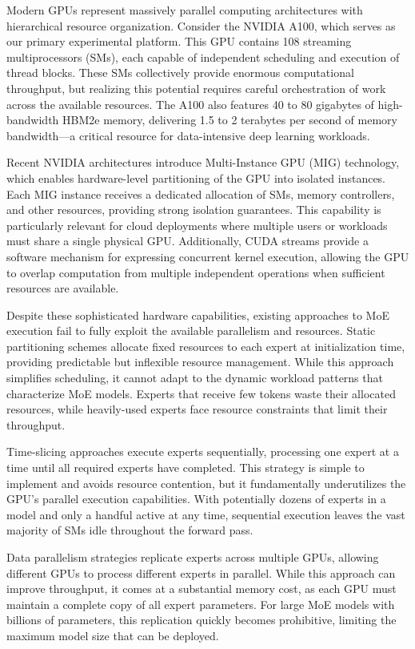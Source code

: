 \documentclass{article}
\begin{document}
Modern GPUs represent massively parallel computing architectures with hierarchical resource organization. Consider the NVIDIA A100, which serves as our primary experimental platform. This GPU contains 108 streaming multiprocessors (SMs), each capable of independent scheduling and execution of thread blocks. These SMs collectively provide enormous computational throughput, but realizing this potential requires careful orchestration of work across the available resources. The A100 also features 40 to 80 gigabytes of high-bandwidth HBM2e memory, delivering 1.5 to 2 terabytes per second of memory bandwidth—a critical resource for data-intensive deep learning workloads.

Recent NVIDIA architectures introduce Multi-Instance GPU (MIG) technology, which enables hardware-level partitioning of the GPU into isolated instances. Each MIG instance receives a dedicated allocation of SMs, memory controllers, and other resources, providing strong isolation guarantees. This capability is particularly relevant for cloud deployments where multiple users or workloads must share a single physical GPU. Additionally, CUDA streams provide a software mechanism for expressing concurrent kernel execution, allowing the GPU to overlap computation from multiple independent operations when sufficient resources are available.

Despite these sophisticated hardware capabilities, existing approaches to MoE execution fail to fully exploit the available parallelism and resources. Static partitioning schemes allocate fixed resources to each expert at initialization time, providing predictable but inflexible resource management. While this approach simplifies scheduling, it cannot adapt to the dynamic workload patterns that characterize MoE models. Experts that receive few tokens waste their allocated resources, while heavily-used experts face resource constraints that limit their throughput.

Time-slicing approaches execute experts sequentially, processing one expert at a time until all required experts have completed. This strategy is simple to implement and avoids resource contention, but it fundamentally underutilizes the GPU's parallel execution capabilities. With potentially dozens of experts in a model and only a handful active at any time, sequential execution leaves the vast majority of SMs idle throughout the forward pass.

Data parallelism strategies replicate experts across multiple GPUs, allowing different GPUs to process different experts in parallel. While this approach can improve throughput, it comes at a substantial memory cost, as each GPU must maintain a complete copy of all expert parameters. For large MoE models with billions of parameters, this replication quickly becomes prohibitive, limiting the maximum model size that can be deployed.
\end{document}
